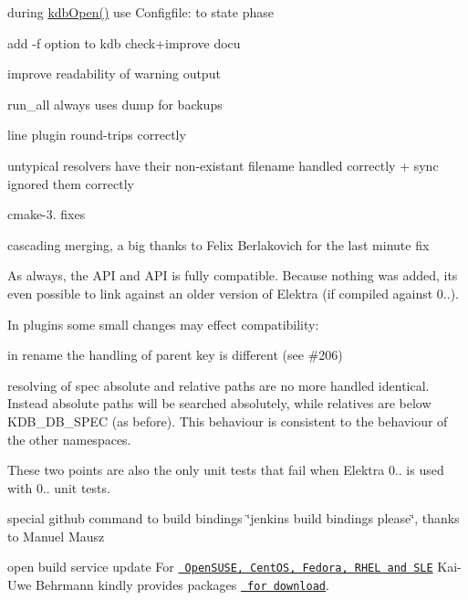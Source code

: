 \begin{DoxyItemize}
\item during \mbox{\hyperlink{group__kdb_ga6808defe5870f328dd17910aacbdc6ca}{kdb\+Open()}} use Configfile\+: to state phase
\item add -\/f option to kdb check+improve docu
\item improve readability of warning output
\item run\+\_\+all always uses dump for backups
\item line plugin round-\/trips correctly
\item untypical resolvers have their non-\/existant filename handled correctly + sync ignored them correctly
\item cmake-\/3. fixes
\item cascading merging, a big thanks to Felix Berlakovich for the last minute fix
\end{DoxyItemize}

As always, the A\+PI and A\+PI is fully compatible. Because nothing was added, its even possible to link against an older version of Elektra (if compiled against 0..).

In plugins some small changes may effect compatibility\+:


\begin{DoxyItemize}
\item in rename the handling of parent key is different (see \#206)
\item resolving of spec absolute and relative paths are no more handled identical. Instead absolute paths will be searched absolutely, while relatives are below K\+D\+B\+\_\+\+D\+B\+\_\+\+S\+P\+EC (as before). This behaviour is consistent to the behaviour of the other namespaces.
\end{DoxyItemize}

These two points are also the only unit tests that fail when Elektra 0.. is used with 0.. unit tests.


\begin{DoxyItemize}
\item special github command to build bindings \char`\"{}jenkins build bindings please\char`\"{}, thanks to Manuel Mausz
\item open build service update For \href{https://build.opensuse.org/package/show/home:bekun:devel/elektra}{\texttt{ Open\+S\+U\+SE, Cent\+OS, Fedora, R\+H\+EL and S\+LE}} Kai-\/\+Uwe Behrmann kindly provides packages \href{http://software.opensuse.org/download.html?project=home%3Abekun%3Adevel&package=libelektra4}{\texttt{ for download}}.
\end{DoxyItemize}

